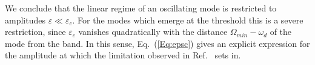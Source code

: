 We conclude that the linear regime of an oscillating mode is restricted to amplitudes $\varepsilon\ll \varepsilon_c$. For the modes which emerge at the threshold this is a severe restriction, since $\varepsilon_c$ vanishes quadratically with the distance $\Omega_{min} - \omega_d$ of the mode from the band. In this sense, Eq.~(\ref{Eq:epsc}) gives an explicit expression for the amplitude at which the limitation observed in Ref.~\cite{mW91} sets in. 
